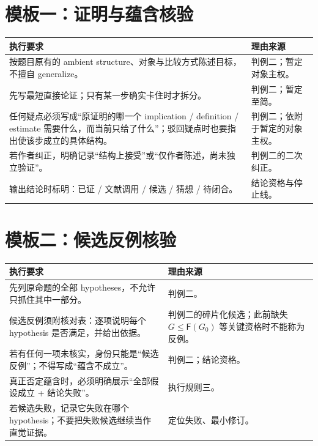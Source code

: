 \documentclass[UTF8,zihao=-4,fontset=none,oneside,openany]{ctexbook}
\newcommand{\FF}{\mathsf F}
\begin{document}
\section{模板一：证明与蕴含核验}
\begin{tabularx}{\textwidth}{@{}X p{53mm}@{}}
\toprule
\textbf{执行要求} & \textbf{理由来源}\\
\midrule
按题目原有的 ambient structure、对象与比较方式陈述目标，不擅自 generalize。 & 判例二；暂定对象主权。\\
先写最短直接论证；只有某一步确实卡住时才拆分。 & 判例二；暂定至简。\\
任何疑点必须写成“原证明的哪一个 implication / definition / estimate 需要什么，而当前只给了什么”；驳回疑点时也要指出使该步成立的具体结构。 & 判例二；依附于暂定的对象主权。\\
若作者纠正，明确记录“结构上接受”或“仅作者陈述，尚未独立验证”。 & 判例二的二次纠正。\\
输出结论时标明：已证 / 文献调用 / 候选 / 猜想 / 待闭合。 & 结论资格与停止线。\\
\bottomrule
\end{tabularx}

\section{模板二：候选反例核验}
\begin{tabularx}{\textwidth}{@{}X p{53mm}@{}}
\toprule
\textbf{执行要求} & \textbf{理由来源}\\
\midrule
先列原命题的全部 hypotheses，不允许只抓住其中一部分。 & 判例二。\\
候选反例须附核对表：逐项说明每个 hypothesis 是否满足，并给出依据。 & 判例二的碎片化候选；此前缺失 $G\leq\FF(G_0)$ 等关键资格时不能称为反例。\\
若有任何一项未核实，身份只能是“候选反例”；不得写成“蕴含不成立”。 & 判例二；结论资格。\\
真正否定蕴含时，必须明确展示“全部假设成立 + 结论失败”。 & 执行规则三。\\
若候选失败，记录它失败在哪个 hypothesis；不要把失败候选继续当作直觉证据。 & 定位失败、最小修订。\\
\bottomrule
\end{tabularx}
\end{document}
